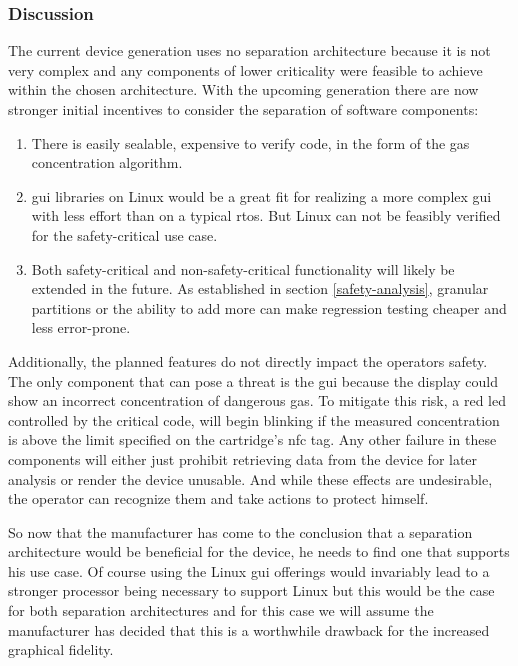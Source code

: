 \subsubsection{Discussion}
The current device generation uses no separation architecture because it is not very complex and any components of lower criticality were feasible to achieve within the chosen architecture. With the upcoming generation there are now stronger initial incentives to consider the separation of software components:
\begin{enumerate}
\item There is easily sealable, expensive to verify code, in the form of the gas concentration algorithm.
\item \acrshort{gui} libraries on Linux would be a great fit for realizing a more complex \acrshort{gui} with less effort than on a typical \acrshort{rtos}. But Linux can not be feasibly verified for the safety-critical use case.
\item Both safety-critical and non-safety-critical functionality will likely be extended in the future. As established in section  \ref{safety-analysis}, granular partitions or the ability to add more can make regression testing cheaper and less error-prone.
\end{enumerate}
Additionally, the planned features do not directly impact the operators safety. The only component that can pose a threat is the \acrshort{gui} because the display could show an incorrect concentration of dangerous gas. To mitigate this risk, a red \acrshort{led} controlled by the critical code, will begin blinking if the measured concentration is above the limit specified on the cartridge's \acrshort{nfc} tag. Any other failure in these components will either just prohibit retrieving data from the device for later analysis or render the device unusable. And while these effects are undesirable, the operator can recognize them and take actions to protect himself.

So now that the manufacturer has come to the conclusion that a separation architecture would be beneficial for the device, he needs to find one that supports his use case.  Of course using the Linux \acrshort{gui} offerings would invariably lead to a stronger processor being necessary to support Linux but this would be the case for both separation architectures and for this case we will assume the manufacturer has decided that this is a worthwhile drawback for the increased graphical fidelity. 

